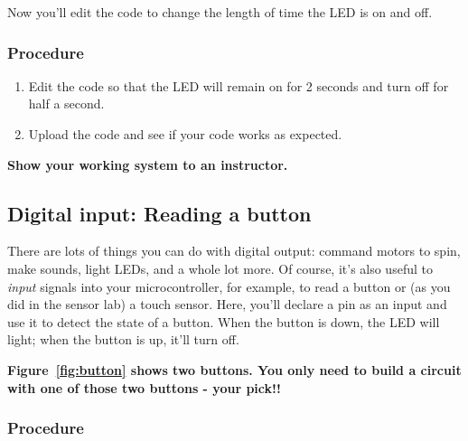\documentclass[11pt]{article} %
\begin{document}
Now you'll edit the code to change the length of time the LED is on and off.

\subsubsection*{Procedure}

\begin{enumerate}
\item Edit the code so that the LED will remain on for 2 seconds and turn off for half a second.
\item Upload the code and see if your code works as expected.
\end{enumerate}

{\bf Show your working system to an instructor.}

\subsection*{Digital input: Reading a button}

There are lots of things you can do with digital output: command motors to spin, make sounds, light LEDs, and a whole lot more. Of course, it’s also useful to \emph{input} signals into your microcontroller, for example, to read a button or (as you did in the sensor lab) a touch sensor. Here, you’ll declare a pin as an input and use it to detect the state of a button. When the button is down, the LED will light; when the button is up, it’ll turn off.

\textbf{Figure~\ref{fig:button} shows two buttons. You only need to build a circuit with one of those two buttons - your pick!!}

\subsubsection*{Procedure}
\end{document}
